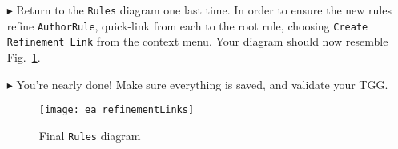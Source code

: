 \begin{itemize}
\item[$\blacktriangleright$] Return to the \texttt{Rules} diagram one last time. In order to ensure the new rules refine \texttt{AuthorRule},
quick-link from each to the root rule, choosing \texttt{Create Refinement Link} from the context menu. Your diagram should now resemble
Fig.~\ref{ea:refinementClasses}.

\item[$\blacktriangleright$] You're nearly done! Make sure everything is saved, and validate your TGG. 

\newpage

\vspace*{3cm}

\begin{figure}[htbp]
\begin{center}
  \texttt{[image: ea\_refinementLinks]}
  \caption{Final \texttt{Rules} diagram}
  \label{ea:refinementClasses}
\end{center}
\end{figure}









\end{itemize}
